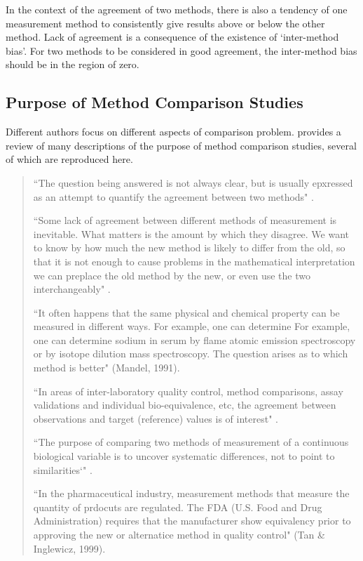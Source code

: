 \documentclass[12pt, a4paper]{report}
\theoremstyle{plain}
\theoremstyle{definition}
\theoremstyle{remark}
\begin{document}

In the context of the agreement of two methods, there is also a
tendency of one measurement method to consistently give results
above or below the other method. Lack of agreement is a
consequence of the existence of `inter-method bias'. For two
methods to be considered in good agreement, the inter-method bias
should be in the region of zero.

	\subsection{Purpose of Method Comparison Studies}
	Different authors focus on different aspects of comparison problem. \citet{BXC2010} provides a review of many descriptions of the purpose of method comparison studies, several of which are reproduced here.
	
	\begin{quote}
		``The question being answered is not always clear, but is usually epxressed as an attempt to quantify the agreement
		between two methods" \citep{BA95}.
		
		``Some lack of agreement between different methods of measurement is inevitable. What matters is the amount by which they disagree. We want to know by how much the new method is likely to differ from the old, so that it is not enough to cause problems in the mathematical interpretation we can preplace the old method by the new, or even use the two interchangeably" \citep{BA99}.
		
		
		``It often happens that the same physical and chemical property can be measured in different ways. For example, one can determine For example, one can determine sodium in serum by flame atomic emission spectroscopy or by isotope dilution mass spectroscopy. The question arises as to which method is better" (Mandel, 1991).
		
		``In areas of inter-laboratory quality control, method comparisons, assay validations and individual bio-equivalence, etc, the agreement between observations and target (reference) values is
		of interest" \citep{lin2002}.
		
		``The purpose of comparing two methods of measurement of a continuous biological variable is to uncover systematic differences, not to point to
		similarities`" \citep{ludbrook97}.
		
		``In the pharmaceutical industry, measurement methods that measure the quantity of prdocuts are regulated. The FDA (U.S. Food and Drug Administration) requires that the manufacturer show equivalency prior to approving the new or alternatice method in quality control" (Tan \& Inglewicz, 1999). 
	\end{quote}
	
\end{document}
